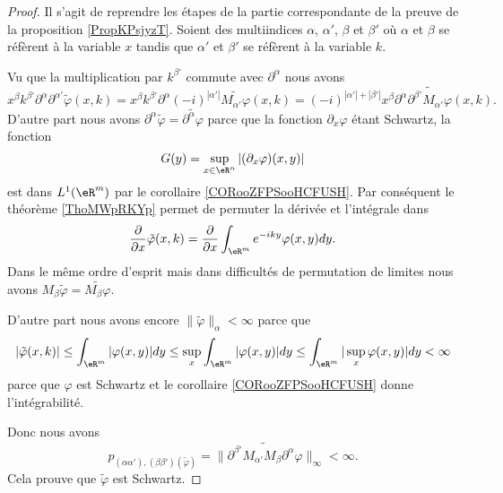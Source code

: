 \begin{proof}
    Il s'agit de reprendre les étapes de la partie correspondante de la preuve de la proposition \ref{PropKPsjyzT}. Soient des multiindices \( \alpha\), \( \alpha'\), \( \beta\) et \( \beta'\) où \( \alpha\) et \( \beta\) se réfèrent à la variable \( x\) tandis que \( \alpha'\) et \( \beta'\) se réfèrent à la variable \( k\).

    Vu que la multiplication par \( k^{\beta'}\) commute avec \( \partial^{\alpha}\) nous avons
    \begin{equation}
        x^{\beta}k^{\beta'}\partial^{\alpha}\partial^{\alpha'}\tilde \varphi(x,k)=x^{\beta}k^{\beta'}\partial^{\alpha}(-i)^{| \alpha' |}\widetilde{M_{\alpha'}\varphi}(x,k)=(-i)^{| \alpha' |+| \beta' |}x^{\beta}\partial^{\alpha}\widetilde{    \partial^{\beta'}M_{\alpha'}\varphi  }(x,k).
    \end{equation}
    D'autre part nous avons \( \partial^{\alpha}\tilde \varphi=\widetilde{\partial^{\alpha}\varphi}\) parce que la fonction \( \partial_x\varphi\) étant Schwartz, la fonction
    \begin{equation}
        G(y)=\sup_{x\in \eR^n}|(\partial_x\varphi)(x,y)|
    \end{equation}
    est dans \( L^1(\eR^m)\) par le corollaire \ref{CORooZFPSooHCFUSH}. Par conséquent le théorème \ref{ThoMWpRKYp} permet de permuter la dérivée et l'intégrale dans 
    \begin{equation}
        \frac{ \partial  }{ \partial x }\tilde \varphi(x,k)=\frac{ \partial  }{ \partial x }\int_{\eR^m} e^{-iky}\varphi(x,y)dy.
    \end{equation}
    Dans le même ordre d'esprit mais dans difficultés de permutation de limites nous avons \( M_{\beta}\tilde \varphi=\widetilde{M_{\beta}\varphi}\).

    D'autre part nous avons encore \( \| \tilde \varphi \|_{\alpha}<\infty\) parce que
    \begin{equation}
        | \tilde \varphi(x,k) |\leq \int_{\eR^m}| \varphi(x,y) |dy\leq \sup_x\int_{\eR^m}| \varphi(x,y) |dy\leq \int_{\eR^m}| \sup_x\varphi(x,y) |dy<\infty
    \end{equation}
    parce que \( \varphi\) est Schwartz et le corollaire \ref{CORooZFPSooHCFUSH} donne l'intégrabilité.

    Donc nous avons
    \begin{equation}
        p_{(\alpha\alpha'),(\beta\beta')(\tilde \varphi)}=\|  \widetilde{   \partial^{\beta'}M_{\alpha'}M_{\beta}\partial^{\alpha}\varphi      }    \|_{\infty}<\infty.
    \end{equation}
    Cela prouve que \( \tilde \varphi\) est Schwartz.
\end{proof}

